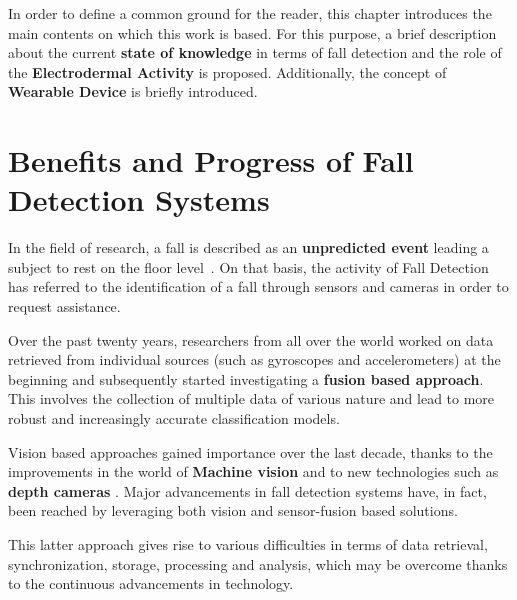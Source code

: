 \label{ch:background}

In order to define a common ground for the reader, this chapter introduces the main contents on which this work is based. For this purpose, a brief description about the current \textbf{state of knowledge} in terms of fall detection and the role of the \textbf{Electrodermal Activity} is proposed. Additionally, the concept of \textbf{Wearable Device} is briefly introduced.

\section{Benefits and Progress of Fall Detection Systems }\label{sec:fallintro}

In the field of research, a fall is described as an \textbf{unpredicted event} leading a subject to rest on the floor level~\cite{Lamb1}. On that basis, the activity of Fall Detection has referred to the identification of a fall through sensors and cameras in order to request assistance.

Over the past twenty years, researchers from all over the world worked on data retrieved from individual sources (such as gyroscopes and accelerometers) at the beginning and subsequently started investigating a \textbf{fusion based approach}. This involves the collection of multiple data of various nature and lead to more robust and increasingly accurate classification models. 

Vision based approaches gained importance over the last decade, thanks to the improvements in the world of \textbf{Machine vision} and to new technologies such as \textbf{depth cameras} \cite{elderlySurvey}. Major advancements in fall detection systems have, in fact, been reached by leveraging both vision and sensor-fusion based solutions. 

This latter approach gives rise to various difficulties in terms of data retrieval, synchronization, storage, processing and analysis, which may be overcome thanks to the continuous advancements in technology.


